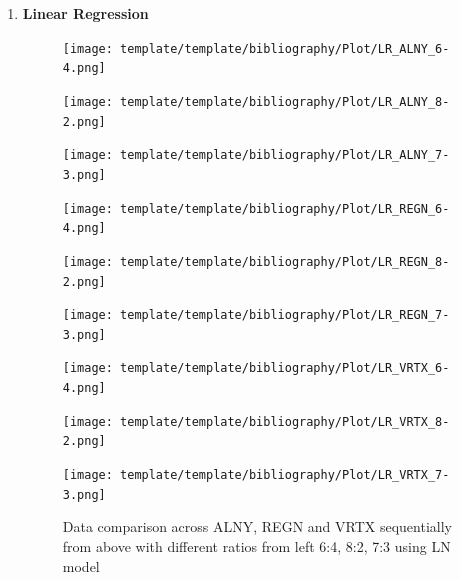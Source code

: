 \documentclass{ieeeojies}
\begin{document}
\begin{enumerate} %
  \item \textbf{Linear Regression} 

 \begin{figure}[H]
    \centering
    \begin{minipage}{0.155\textwidth}
    \centering
    \texttt{[image: template/template/bibliography/Plot/LR\_ALNY\_6-4.png]}
    \end{minipage}
    \hfill
    \begin{minipage}{0.155\textwidth}
    \centering
    \texttt{[image: template/template/bibliography/Plot/LR\_ALNY\_8-2.png]}
    \end{minipage}
    \hfill
    \begin{minipage}{0.155\textwidth}
    \centering
    \texttt{[image: template/template/bibliography/Plot/LR\_ALNY\_7-3.png]}
    \end{minipage}
    \hfill
    \begin{minipage}{0.155\textwidth}
    \centering
    \texttt{[image: template/template/bibliography/Plot/LR\_REGN\_6-4.png]}
    \end{minipage}
    \hfill
    \begin{minipage}{0.155\textwidth}
    \centering
    \texttt{[image: template/template/bibliography/Plot/LR\_REGN\_8-2.png]}
    \end{minipage}
    \hfill
    \begin{minipage}{0.155\textwidth}
    \centering
    \texttt{[image: template/template/bibliography/Plot/LR\_REGN\_7-3.png]}
    \end{minipage}
    \hfill
    \begin{minipage}{0.155\textwidth}
    \centering
    \texttt{[image: template/template/bibliography/Plot/LR\_VRTX\_6-4.png]}
    \end{minipage}
    \hfill
    \begin{minipage}{0.155\textwidth}
    \centering
    \texttt{[image: template/template/bibliography/Plot/LR\_VRTX\_8-2.png]}
    \end{minipage}
    \hfill
    \begin{minipage}{0.155\textwidth}
    \centering
    \texttt{[image: template/template/bibliography/Plot/LR\_VRTX\_7-3.png]}
    \end{minipage}
\caption{Data comparison across ALNY, REGN and VRTX sequentially from above with different ratios from left 6:4, 8:2, 7:3 using LN model}
\label{fig:combined}
\end{figure}




\end{enumerate}
\end{document}
